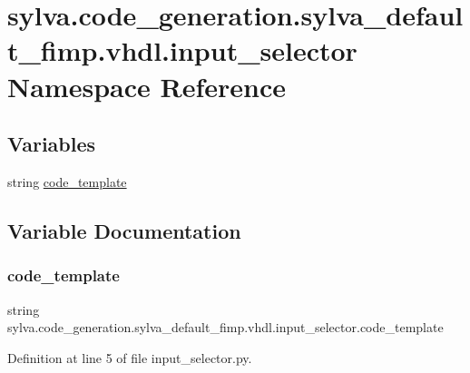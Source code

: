 \hypertarget{namespacesylva_1_1code__generation_1_1sylva__default__fimp_1_1vhdl_1_1input__selector}{}\section{sylva.\+code\+\_\+generation.\+sylva\+\_\+default\+\_\+fimp.\+vhdl.\+input\+\_\+selector Namespace Reference}
\label{namespacesylva_1_1code__generation_1_1sylva__default__fimp_1_1vhdl_1_1input__selector}
\subsection*{Variables}
\begin{DoxyCompactItemize}
\item 
string \hyperlink{namespacesylva_1_1code__generation_1_1sylva__default__fimp_1_1vhdl_1_1input__selector_abf41616a9b9340b79fce8766be87fb52}{code\+\_\+template}
\end{DoxyCompactItemize}


\subsection{Variable Documentation}
\mbox{\label{namespacesylva_1_1code__generation_1_1sylva__default__fimp_1_1vhdl_1_1input__selector_abf41616a9b9340b79fce8766be87fb52}} 
\subsubsection{\texorpdfstring{code\+\_\+template}{code\_template}}
{\footnotesize\ttfamily string sylva.\+code\+\_\+generation.\+sylva\+\_\+default\+\_\+fimp.\+vhdl.\+input\+\_\+selector.\+code\+\_\+template}



Definition at line 5 of file input\+\_\+selector.\+py.

